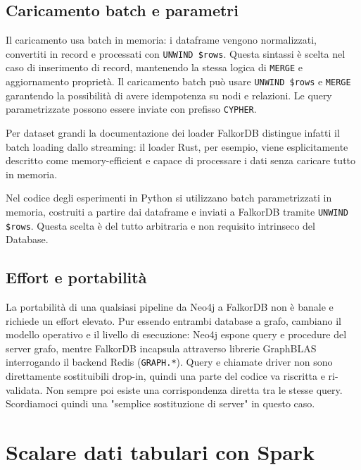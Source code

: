 \documentclass{article}
\begin{document}
\subsection{Caricamento batch e parametri}
Il caricamento usa batch in memoria: i dataframe vengono normalizzati, convertiti in record e %
processati con \texttt{UNWIND \$rows}.%
Questa sintassi è scelta nel caso di inserimento di record, mantenendo la stessa logica di \texttt{MERGE} %
e aggiornamento proprietà. Il caricamento batch può usare \texttt{UNWIND \$rows} e %
\texttt{MERGE} garantendo la possibilità di avere idempotenza su nodi e relazioni. %
Le query parametrizzate possono essere inviate con prefisso \texttt{CYPHER}.




Per dataset grandi la documentazione dei loader FalkorDB distingue infatti il batch %
loading dallo streaming: il loader Rust, per esempio, viene esplicitamente descritto %
come memory-efficient e capace di processare i dati senza caricare tutto in memoria.%

Nel codice degli esperimenti in Python si utilizzano batch parametrizzati in memoria, costruiti a partire dai %
dataframe e inviati a FalkorDB tramite \texttt{UNWIND \$rows}. Questa scelta è del tutto arbitraria e %
non requisito intrinseco del Database.

\subsection{Effort e portabilità}
La portabilità di una qualsiasi pipeline da Neo4j a FalkorDB non è banale e richiede un effort elevato. %
Pur essendo entrambi database a grafo, cambiano il modello operativo e il livello di esecuzione: %
Neo4j espone query e procedure del server grafo, mentre FalkorDB incapsula attraverso librerie GraphBLAS %
\cite{Repository-FalkorDB-graphBlas} \cite{GraphBLAS} interrogando il backend Redis (\texttt{GRAPH.*}).
Query e chiamate driver non sono direttamente sostituibili drop-in, %
quindi una parte del codice va riscritta e ri-validata. %
Non sempre poi esiste una corrispondenza diretta tra le stesse query. %
Scordiamoci quindi una "semplice sostituzione di server" in questo caso.



\section{Scalare dati tabulari con Spark}
\end{document}
